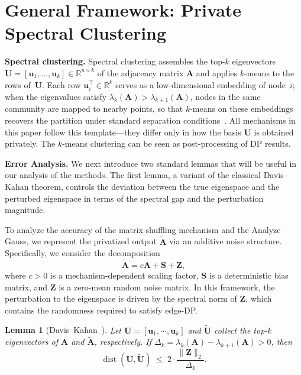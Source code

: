 \documentclass[11pt]{article}
\theoremstyle{plain}
\newtheorem{lemma}{Lemma}[section]
\theoremstyle{definition}
\theoremstyle{remark}
\begin{document}
\section{General Framework: Private Spectral Clustering}



\textbf{Spectral clustering.} Spectral clustering assembles the top-$k$ eigenvectors  $\mathbf{U} = [\mathbf{u}_1, \ldots, \mathbf{u}_k] \in \mathbb{R}^{n \times k}$  of the adjacency matrix $\mathbf{A}$ and applies $k$-means to the rows  of~$\mathbf{U}$. Each row $\mathbf{u}_i^\top \in \mathbb{R}^k$ serves as a low-dimensional  embedding of node~$i$; when the eigenvalues satisfy  $\lambda_k(\mathbf{A}) > \lambda_{k+1}(\mathbf{A})$, nodes in the same  community are mapped to nearby points, so that $k$-means on these  embeddings recovers the partition under standard separation  conditions~\citep{von2007tutorial, mcsherry2001spectral}. 
All mechanisms in this paper follow this template---they differ only in how the basis $\mathbf{U}$ is obtained privately. The $k$-means clustering can be seen as post-processing of DP results.



\textbf{Error Analysis.} We next introduce two standard lemmas that will be useful in our analysis of the methods. 
The first lemma, a variant of the classical Davis--Kahan theorem, 
controls the deviation between the true eigenspace and the perturbed eigenspace 
in terms of the spectral gap and the perturbation magnitude.


To analyze the accuracy of the matrix shuffling mechanism and the Analyze Gauss, we represent the privatized output $\widetilde{\mathbf{A}}$ via an additive noise structure. Specifically, we consider the decomposition
\begin{equation}
    \widetilde{\mathbf{A}} = c \mathbf{A} + \mathbf{S} + \mathbf{Z},
\end{equation}
where $c > 0$ is a mechanism-dependent scaling factor, $\mathbf{S}$ is a deterministic bias matrix, and $\mathbf{Z}$ is a zero-mean random noise matrix. In this framework, the perturbation to the eigenspace is  driven by the spectral norm of $\mathbf{Z}$, which contains the randomness required to satisfy edge-DP.


\begin{lemma}[Davis--Kahan~\citep{stewart1998perturbation}]
\label{lem:DK_explicit}
Let $\mathbf{U}=[\mathbf{u}_1,\cdots,\mathbf{u}_k]$ and $\widetilde{\mathbf{U}}$ collect the top-$k$ eigenvectors of $\mathbf{A}$ and $\widetilde{\mathbf{A}}$, respectively. 
If $\Delta_k = \lambda_k(\mathbf{A})-\lambda_{k+1}(\mathbf{A})>0$, then
\[
\operatorname{dist}(\mathbf{U},\widetilde{\mathbf{U}})
\;\le\; 2 \cdot\frac{\|\mathbf{Z}\|_2}{\Delta_k}.
\]
\end{lemma}
\end{document}
